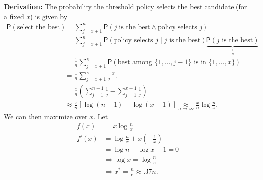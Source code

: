 \documentclass[plain]{article}
\newcommand{\1}{\mathbbm{1}}
\newcommand{\Prob}{ \mathsf{P} }
\begin{document}
\textbf{Derivation:}
The probability the threshold policy selects the best candidate (for a fixed $x$) is given by
\begin{align*}
\Prob(\text{select the best})
&= \sum_{j=x+1}^n \Prob(j\text{ is the best} \wedge \text{policy selects }j)\\
&= \sum_{j=x+1}^n \Prob(\text{policy selects }j\mid j\text{ is the best})
    \underbrace{\Prob(j\text{ is the best})}_{\frac{1}{n}}\\
&= \frac{1}{n}\sum_{j=x+1}^n\Prob(\text{best among }\{1,\ldots,j-1\}\text{ is in }\{1,\ldots,x\})\\
&= \frac{1}{n}\sum_{j=x+1}^n\frac{x}{j-1}\\
&= \frac{x}{n}\left(\sum_{j=1}^{n-1}\frac{1}{j} - \sum_{j=1}^{x-1}\frac{1}{j}\right)\\
&\approx \frac{x}{n} \left[ \log(n-1) - \log(x-1) \right]
\underset{n\to\infty}{\approx} \frac{x}{n}\log\frac{n}{x}.
\end{align*}
We can then maximize over $x$.
Let
\begin{align*}
f(x) &= x \log \frac{n}{x}\\
f'(x) &= \log \frac{n}{x} + x\left(-\frac{1}{x}\right)\\
&= \log n - \log x - 1 = 0\\
&\Rightarrow \log x = \log \frac{n}{e}\\
&\Rightarrow x^* = \frac{n}{e} \approx .37 n.
\end{align*}
\end{document}
